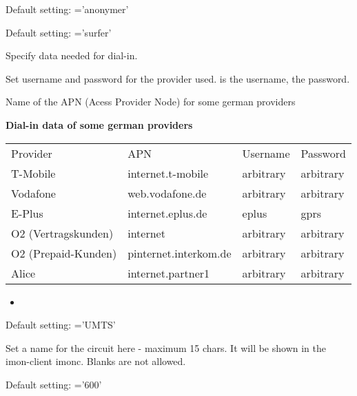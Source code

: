 \begin{description}

	Default setting:  ='anonymer'


	Default setting:  ='surfer'

	Specify data needed for dial-in.

	Set username and password for the provider used. 
	 is the username,
	 the password.

	Name of the APN (Acess Provider Node) for some german providers
	\begin{table}
	\textbf{Dial-in data of some german providers}

	\vspace{1ex}
	\begin{tabular}{llll}
	Provider            &APN                   &Username     &Password \\
	T-Mobile            &internet.t-mobile     &arbitrary    &arbitrary \\
	Vodafone            &web.vodafone.de       &arbitrary    &arbitrary \\
	E-Plus              &internet.eplus.de     &eplus        &gprs \\
	O2 (Vertragskunden) &internet              &arbitrary    &arbitrary \\
	O2 (Prepaid-Kunden) &pinternet.interkom.de &arbitrary    &arbitrary \\
	Alice               &internet.partner1     &arbitrary    &arbitrary \\
	\end{tabular}
	\end{table}

	\begin{itemize}
	\item {}
	\end{itemize}



	Default setting:  ='UMTS'

	Set a name for the  circuit here - maximum 15 chars.
	It will be shown in the imon-client imonc. Blanks are not 
	allowed.
 	

	Default setting:  ='600'


\end{description}
